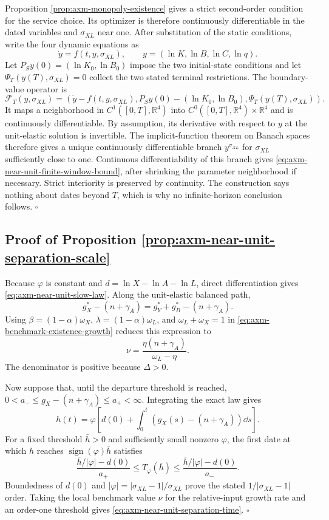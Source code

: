 Proposition \ref{prop:axm-monopoly-existence} gives a strict second-order
condition for the service choice. Its optimizer is therefore continuously
differentiable in the dated variables and \(\sigma_{XL}\) near one. After
substitution of the static conditions, write the four dynamic equations as
\[
 \dot y=f(t,y,\sigma_{XL}),
 \qquad y=(\ln K,\ln B,\ln C,\ln q).
\]
Let \(P_Sy(0)=(\ln K_0,\ln B_0)\) impose the two initial-state conditions and
let \(\Psi_T(y(T),\sigma_{XL})=0\) collect the two stated terminal
restrictions. The boundary-value operator is
\[
 \mathcal F_T(y,\sigma_{XL})=
 \left(\dot y-f(t,y,\sigma_{XL}),
 P_Sy(0)-(\ln K_0,\ln B_0),
 \Psi_T(y(T),\sigma_{XL})\right).
\]
It maps a neighborhood in \(C^1([0,T],\mathbb R^4)\) into
\(C^0([0,T],\mathbb R^4)\times\mathbb R^4\) and is continuously
differentiable. By assumption, its derivative with respect to \(y\) at the
unit-elastic solution is invertible. The implicit-function theorem on Banach
spaces therefore gives a unique continuously differentiable branch
\(y^{\sigma_{XL}}\) for \(\sigma_{XL}\) sufficiently close to one.
Continuous differentiability of this branch gives
\eqref{eq:axm-near-unit-finite-window-bound}, after shrinking the parameter
neighborhood if necessary. Strict interiority is preserved by continuity.
The construction says nothing about dates beyond \(T\), which is why no
infinite-horizon conclusion follows. \(\square\)

\subsection{Proof of Proposition \ref{prop:axm-near-unit-separation-scale}}

Because \(\varphi\) is constant and \(d=\ln X-\ln A-\ln L\), direct
differentiation gives \eqref{eq:axm-near-unit-slow-law}. Along the unit-elastic
balanced path,
\[
 g_X^*-(n+\gamma_A)=g_Y^*+g_B^*-(n+\gamma_A).
\]
Using \(\beta=(1-\alpha)\omega_X\),
\(\lambda=(1-\alpha)\omega_L\), and
\(\omega_L+\omega_X=1\) in
\eqref{eq:axm-benchmark-existence-growth} reduces this expression to
\[
 \nu=\frac{\eta(n+\gamma_A)}{\omega_L-\eta}.
\]
The denominator is positive because \(\Delta>0\).

Now suppose that, until the departure threshold is reached,
\(0<a_-\leq g_X-(n+\gamma_A)\leq a_+<\infty\). Integrating the exact law gives
\[
 h(t)=\varphi\left[d(0)+\int_0^t(g_X(s)-(n+\gamma_A))\dd s\right].
\]
For a fixed threshold \(\bar h>0\) and sufficiently small nonzero
\(\varphi\), the first date at which \(h\) reaches
\(\operatorname{sign}(\varphi)\bar h\) satisfies
\[
 \frac{\bar h/|\varphi|-d(0)}{a_+}
 \leq T_{\varphi}(\bar h)\leq
 \frac{\bar h/|\varphi|-d(0)}{a_-}.
\]
Boundedness of \(d(0)\) and
\(|\varphi|=|\sigma_{XL}-1|/\sigma_{XL}\) prove the stated
\(1/|\sigma_{XL}-1|\) order. Taking the local benchmark value \(\nu\) for the
relative-input growth rate and an order-one threshold gives
\eqref{eq:axm-near-unit-separation-time}. \(\square\)

